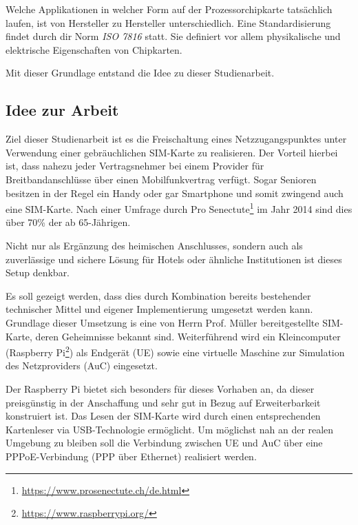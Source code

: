 Welche Applikationen in welcher Form auf der Prozessorchipkarte tatsächlich laufen, ist von Hersteller zu Hersteller unterschiedlich.
Eine Standardisierung findet durch dir Norm \textit{ISO 7816} statt. Sie definiert vor allem physikalische
und elektrische Eigenschaften von Chipkarten.

Mit dieser Grundlage entstand die Idee zu dieser Studienarbeit.

\subsection[Idee zur Arbeit (Schenkel)]{Idee zur Arbeit}
\label{idee-arbeit}
Ziel dieser Studienarbeit ist es die Freischaltung eines Netzzugangspunktes unter Verwendung einer 
gebräuchlichen \ac{SIM}-Karte zu realisieren. Der Vorteil hierbei ist, dass nahezu jeder
Vertragsnehmer bei einem Provider für Breitbandanschlüsse über einen Mobilfunkvertrag verfügt.
Sogar Senioren besitzen in der Regel ein Handy oder gar Smartphone und somit zwingend auch eine
\ac{SIM}-Karte. Nach einer Umfrage durch Pro Senectute\footnote{\url{https://www.prosenectute.ch/de.html}}
im Jahr 2014 sind dies über 70\% der ab 65-Jährigen.

Nicht nur als Ergänzung des heimischen Anschlusses, sondern auch als zuverlässige und sichere Lösung
für Hotels oder ähnliche Institutionen ist dieses Setup denkbar.

Es soll gezeigt werden, dass dies durch Kombination bereits bestehender technischer Mittel und
eigener Implementierung umgesetzt werden kann. Grundlage dieser Umsetzung is eine von Herrn Prof. Müller
bereitgestellte \ac{SIM}-Karte, deren Geheimnisse bekannt sind. Weiterführend wird ein Kleincomputer
(Raspberry Pi\footnote{\url{https://www.raspberrypi.org/}}) als Endgerät (\ac{UE}) sowie eine virtuelle
Maschine zur Simulation des Netzproviders (\ac{AuC}) eingesetzt. 

Der Raspberry Pi bietet sich besonders für dieses Vorhaben an, da dieser preisgünstig in der Anschaffung
und sehr gut in Bezug auf Erweiterbarkeit konstruiert ist. Das Lesen der \ac{SIM}-Karte
wird durch einen entsprechenden Kartenleser via USB-Technologie ermöglicht. Um möglichst nah
an der realen Umgebung zu bleiben soll die Verbindung zwischen \ac{UE} und \ac{AuC} über eine
\ac{PPPoE}-Verbindung (\ac{PPP} über Ethernet) realisiert werden.

\clearpage
